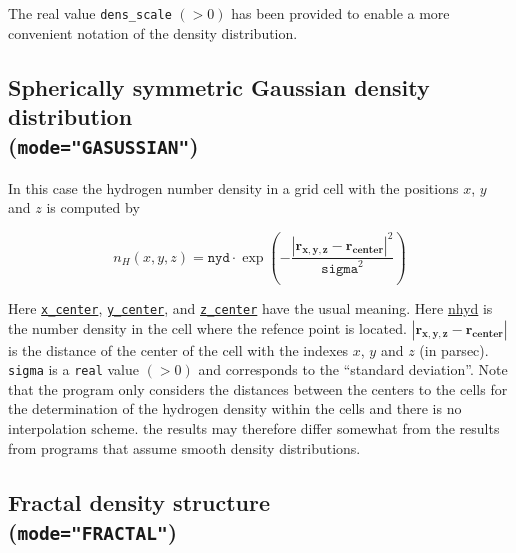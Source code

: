 \documentclass[a4paper,10pt]{article}
\begin{document}
\begin{appendix}
The real value \texttt{dens\_scale} $(>0)$ has been provided to 
enable a more convenient notation of the density distribution.

\subsection{Spherically symmetric Gaussian density distribution\\
(\texttt{mode="GASUSSIAN"})}
In this case the hydrogen number density in a grid cell with the positions $x$, 
$y$ and $z$ is computed by

\begin{equation}
 n_H(x,y,z) = \mathtt{nyd} \cdot \exp\left(- \frac{\left|\mathbf{r_{x,y,z}} - 
\mathbf{r_{center}} \right|^2}{\mathtt{sigma}^2}\right)
\end{equation}

Here \hyperref[hydopt:xcenter]{\texttt{x\_center}}, 
\hyperref[hydopt:ycenter]{\texttt{y\_center}}, 
and \hyperref[hydopt:zcenter]{\texttt{z\_center}} have the 
usual meaning. 
Here \hyperref[hydopt:nhyd]{nhyd} is the number density in the cell where the 
refence point is located. 
$\left|\mathbf{r_{x,y,z}} - \mathbf{r_{center}} \right|$ is the
distance of the center of the cell with the indexes $x$, $y$ and $z$ (in 
parsec). 
\texttt{sigma} is a \texttt{real} value $(>0)$ and corresponds to the ``standard
deviation''.
Note that the program only considers the distances between the centers to the 
cells for the determination of the hydrogen density within the cells and there 
is no interpolation scheme. the results may therefore differ somewhat from the 
results from programs that assume smooth density distributions.

\subsection{Fractal density structure\\
(\texttt{mode="FRACTAL"})}


\end{appendix}
\end{document}
